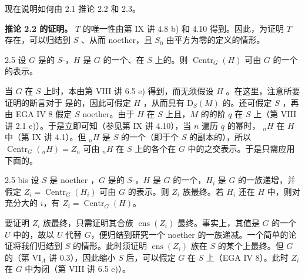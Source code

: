 现在说明如何由 2.1 推论 2.2 和 2.3。

\textbf{推论 2.2 的证明。}
$T$ 的唯一性由第 IX 讲 4.8 b) 和 4.10 得到。因此，为证明 $T$ 存在，可以归结到 $S$ 、从而 noether，且 $S_0$ 由平方为零的定义的情形。
\begin{SGAresult}{}{2.5}
设 $G$ 是的 $S$-，$H$ 是 $G$ 的一个、在 $S$ 上的。则 $\operatorname{Centr}_G(H)$ 可由 $G$ 的一个的表示。
\end{SGAresult}
当 $G$ 在 $S$ 上时，本由第 VIII 讲 6.5 e) 得到，而无须假设 $H$ 。在这里，注意所要证明的断言对于 是的，因此可假定 $H$ ，从而具有 $\mathrm D_S(M)$ 的。还可假定 $S$ ，再由 EGA IV 8 假定 $S$ noether。由于 $H$ 在 $S$ 上且，$M$ 的的阶 $q$ 在 $S$ 上（第 VIII 讲 2.1 e)）。于是立即可知（参见第 IX 讲 4.10），当 $n$ 遍历 $q$ 的幂时， ${}_nH$ 在 $H$ 中（第 IX 讲 4.1）。但 ${}_nH$ 是 $S$ 的一个（即于个 $S$ 的副本的），所以 $\operatorname{Centr}_G({}_nH)=Z_n$ 可由 ${}_nH$ 在 $S$ 上的各个在 $G$ 中的之交表示。于是只需应用下面的。
\begin{SGAresult}{}{2.5 bis}
设 $S$ 是 noether ，$G$ 是的 $S$-，$H$ 是 $G$ 的一个，$H_i$ 是 $G$ 的一族递增，并假定 $Z_i=\operatorname{Centr}_G(H_i)$ 可由 $G$ 的表示。则 $Z_i$ 族最终。若 $H_i$ 还在 $H$ 中，则对充分大的 $i$，有 $Z_i=\operatorname{Centr}_G(H)$。
\end{SGAresult}
要证明 $Z_i$ 族最终，只需证明其合族 $\operatorname{ens}(Z_i)$ 最终。事实上，其值是 $G$ 的一个 $U$ 中的，故以 $U$ 代替 $G$，便归结到研究一个 noether 的一族递减。一个简单的论证将我们归结到 $S$ 的情形。此时须证明 $\operatorname{ens}(Z_i)$ 族在 $S$ 的某个上最终。但 $G$ 的（第 VI$_A$ 讲 0.3），因此缩小 $S$ 后，可以假定 $G$ 在 $S$ 上（EGA IV 8）。此时 $Z_i$ 在 $G$ 中为闭（第 VIII 讲 6.5 e)）。
